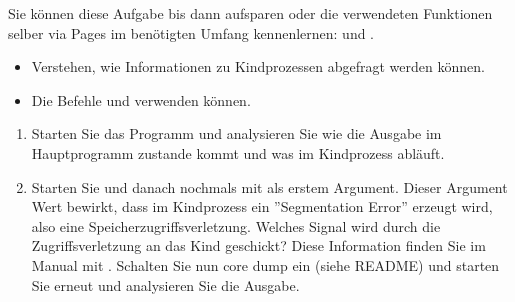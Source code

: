 \documentclass[a4paper,10pt,english]{report}
\begin{document}
\sphinxAtStartPar
Sie können diese Aufgabe bis dann aufsparen oder die verwendeten Funktionen selber via  Pages im benötigten Umfang kennenlernen:  und .

\sphinxAtStartPar
{}
\begin{itemize}
\item {} 
\sphinxAtStartPar
Verstehen, wie Informationen zu Kindprozessen abgefragt werden können.

\item {} 
\sphinxAtStartPar
Die Befehle  und  verwenden können.

\end{itemize}

\sphinxAtStartPar
{}
\begin{enumerate}
%
\item {} 
\sphinxAtStartPar
Starten Sie das Programm  und analysieren Sie wie die Ausgabe im Hauptprogramm zustande kommt und was im Kindprozess  abläuft.

\begin{sphinxVerbatim}[commandchars=\\\{\}]

\end{sphinxVerbatim}

\item {} 
\sphinxAtStartPar
Starten Sie  und danach nochmals mit  als erstem Argument. Dieser Argument Wert bewirkt, dass im Kindprozess ein ”Segmentation Error” erzeugt wird, also eine Speicherzugriffsverletzung. Welches Signal wird durch die Zugriffsverletzung an das Kind geschickt? Diese Information finden Sie im Manual mit . Schalten Sie nun core dump ein (siehe README) und starten Sie  erneut und analysieren Sie die Ausgabe.

\end{enumerate}

\begin{sphinxVerbatim}[commandchars=\\\{\}]

\end{sphinxVerbatim}
\end{document}
